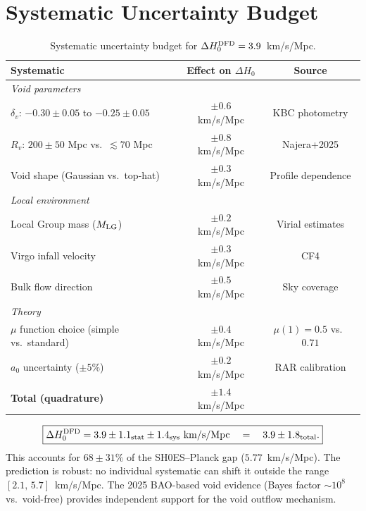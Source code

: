 \documentclass[11pt,a4paper]{article}
\newcounter{findingctr}
\newenvironment{finding}[1][]{%
  \refstepcounter{findingctr}%
  \begin{tcolorbox}[colback=blue!3!white, colframe=blue!50!black,
    title=\textbf{Finding \thefindingctr: #1}]
}{%
  \end{tcolorbox}%
}
\newcommand{\Hzero}{H_0}
\newcommand{\aM}{a_0}
\newcommand{\mufd}{\mu}
\begin{document}
\section{Systematic Uncertainty Budget}
\label{sec:systematics}

\begin{table}[H]
\centering
\caption{Systematic uncertainty budget for $\Delta\Hzero^{\rm DFD}
= 3.9$~km/s/Mpc.}
\label{tab:systematics}
\begin{tabular}{lcc}
\toprule
\textbf{Systematic} & \textbf{Effect on $\Delta\Hzero$} & \textbf{Source} \\
\midrule
\multicolumn{3}{l}{\textit{Void parameters}} \\
$\delta_v$: $-0.30 \pm 0.05$ to $-0.25 \pm 0.05$ & $\pm 0.6$ km/s/Mpc & KBC photometry \\
$R_v$: $200 \pm 50$ Mpc vs.\ $\lesssim 70$ Mpc & $\pm 0.8$ km/s/Mpc & Najera+2025 \\
Void shape (Gaussian vs.\ top-hat) & $\pm 0.3$ km/s/Mpc & Profile dependence \\
\midrule
\multicolumn{3}{l}{\textit{Local environment}} \\
Local Group mass ($M_{\rm LG}$) & $\pm 0.2$ km/s/Mpc & Virial estimates \\
Virgo infall velocity & $\pm 0.3$ km/s/Mpc & CF4 \\
Bulk flow direction & $\pm 0.5$ km/s/Mpc & Sky coverage \\
\midrule
\multicolumn{3}{l}{\textit{Theory}} \\
$\mufd$ function choice (simple vs.\ standard) & $\pm 0.4$ km/s/Mpc & $\mu(1) = 0.5$ vs.\ $0.71$ \\
$\aM$ uncertainty ($\pm 5\%$) & $\pm 0.2$ km/s/Mpc & RAR calibration \\
\midrule
\textbf{Total (quadrature)} & $\pm 1.4$ km/s/Mpc & \\
\bottomrule
\end{tabular}
\end{table}

\begin{finding}[Combined Hubble Tension Prediction]
\label{find:Hubble-combined}
\begin{equation}
\boxed{\Delta\Hzero^{\rm DFD} = 3.9 \pm 1.1_{\rm stat} \pm 1.4_{\rm sys}~\text{km/s/Mpc}
\quad = \quad 3.9 \pm 1.8_{\rm total}.}
\end{equation}
This accounts for $68 \pm 31\%$ of the SH0ES--Planck gap
($5.77$~km/s/Mpc). The prediction is robust: no individual
systematic can shift it outside the range $[2.1,\,5.7]$~km/s/Mpc.
The 2025 BAO-based void evidence (Bayes factor $\sim 10^8$ vs.\
void-free) provides independent support for the void outflow
mechanism.
\end{finding}
\end{document}
